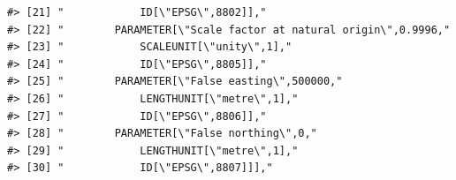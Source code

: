 \documentclass[
]{book}
\begin{document}
\begin{verbatim}
#> [21] "            ID[\"EPSG\",8802]],"                                                                                                                                                                                                                                                
#> [22] "        PARAMETER[\"Scale factor at natural origin\",0.9996,"                                                                                                                                                                                                                   
#> [23] "            SCALEUNIT[\"unity\",1],"                                                                                                                                                                                                                                            
#> [24] "            ID[\"EPSG\",8805]],"                                                                                                                                                                                                                                                
#> [25] "        PARAMETER[\"False easting\",500000,"                                                                                                                                                                                                                                    
#> [26] "            LENGTHUNIT[\"metre\",1],"                                                                                                                                                                                                                                           
#> [27] "            ID[\"EPSG\",8806]],"                                                                                                                                                                                                                                                
#> [28] "        PARAMETER[\"False northing\",0,"                                                                                                                                                                                                                                        
#> [29] "            LENGTHUNIT[\"metre\",1],"                                                                                                                                                                                                                                           
#> [30] "            ID[\"EPSG\",8807]]],"                                                                                                                                                                                                                                               

\end{verbatim}
\end{document}
